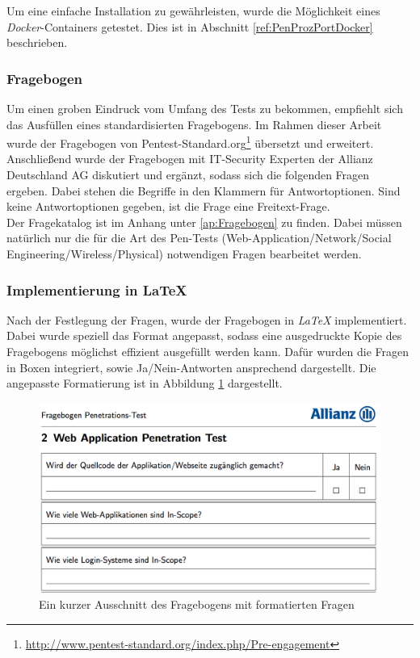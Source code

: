Um eine einfache Installation zu gewährleisten, wurde die Möglichkeit eines \textit{Docker}-Containers getestet. Dies ist in Abschnitt \ref{ref:PenProzPortDocker} beschrieben.

\subsubsection{Fragebogen}\label{ref:KategorienUndFragen}
Um einen groben Eindruck vom Umfang des Tests zu bekommen, empfiehlt sich das Ausfüllen eines standardisierten Fragebogens. Im Rahmen dieser Arbeit wurde der Fragebogen von Pentest-Standard.org\footnote{\url{http://www.pentest-standard.org/index.php/Pre-engagement}} übersetzt und erweitert. Anschließend wurde der Fragebogen mit IT-Security Experten der Allianz Deutschland AG diskutiert und ergänzt, sodass sich die folgenden Fragen ergeben. Dabei stehen die Begriffe in den Klammern für Antwortoptionen. Sind keine Antwortoptionen gegeben, ist die Frage eine Freitext-Frage.\\

Der Fragekatalog ist im Anhang unter \ref{ap:Fragebogen} zu finden. Dabei müssen natürlich nur die für die Art des Pen-Tests (Web-Application/Network/Social Engineering/Wireless/Physical) notwendigen Fragen bearbeitet werden.

\subsubsection{Implementierung in LaTeX}\label{ref:AufImplInTex}
Nach der Festlegung der Fragen, wurde der Fragebogen in \textit{LaTeX} implementiert. Dabei wurde speziell das Format angepasst, sodass eine ausgedruckte Kopie des Fragebogens möglichst effizient ausgefüllt werden kann. Dafür wurden die Fragen in Boxen integriert, sowie Ja/Nein-Antworten ansprechend dargestellt. Die angepasste Formatierung ist in Abbildung \ref{fig:FragLatex} dargestellt.\\

\begin{figure}[htbp]
	\centering
	\includegraphics[width=\textwidth]{bilder/pentest_prozesse/vorbereitung/fragebogen_latex.png}
	\caption{Ein kurzer Ausschnitt des Fragebogens mit formatierten Fragen}
	\label{fig:FragLatex}
\end{figure}


